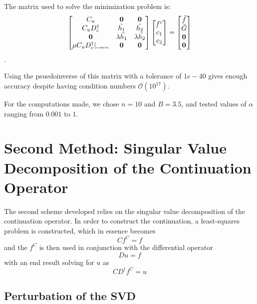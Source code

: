 \documentclass[11pt]{amsart}
\begin{document}
The matrix used to solve the minimization problem is:
\begin{equation}
\begin{bmatrix}
C_u & \mathbf{0} & \mathbf{0}\\
C_u D_c^{\dagger} & \tilde{h_1} & \tilde{h_2} \\
\mathbf{0} & \lambda \tilde{h_1} & \lambda \tilde{h_2} \\
\mu C_u D_c^{\dagger}|_{\text{\tiny{coarse}}} & \mathbf{0} & \mathbf{0}
\end{bmatrix}
\begin{bmatrix}
f^c \\
c_1\\
c_2
\end{bmatrix}
= 
\begin{bmatrix}
\tilde{f} \\
\tilde{G}\\
\mathbf{0}\\
\mathbf{0}
\end{bmatrix}
\end{equation}.  

Using the psuedoinverse of this matrix with a tolerance of $1e-40$ gives enough accuracy despite having condition numbers $\mathcal{O}(10^{17})$.  

For the computations made, we chose $n=10$ and $B=3.5$, and tested values of $\alpha$ ranging from $0.001$ to $1$.  




\section{Second Method: Singular Value Decomposition of the Continuation Operator}
The second scheme developed relies on the singular value decomposition of the continuation operator. In order to construct the continuation, a least-squares problem is constructed, which in essence becomes 
\begin{equation}
C f^C=f
\end{equation}
and the $f^C$ is then used in conjunction with the differential operator 
\begin{equation}
Du=f
\end{equation}
with an end result solving for $u$ as
\begin{equation}
CD^{\dag}f^C=u
\end{equation}
\subsection{Perturbation of the SVD}
 
\end{document}
